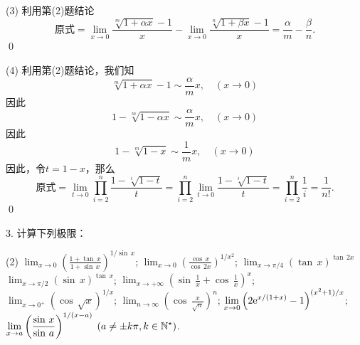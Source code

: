 (3) \solve 利用第(2)题结论
\begin{equation}
    \text{原式} = \lim_{x \to 0} \frac{\sqrt[m]{1+\alpha x}-1}{x} - \lim_{x \to 0} \frac{\sqrt[n]{1+\beta x}-1}{x} = \frac{\alpha}{m} - \frac{\beta}{n}. 
\end{equation}
\qed\bigskip

(4) \solve 利用第(2)题结论，我们知
\begin{equation}
    \sqrt[m]{1+\alpha x} - 1 \sim \frac{\alpha}{m} x, \quad (x \to 0)
\end{equation}
因此
\begin{equation}
    1 - \sqrt[m]{1-\alpha x} \sim \frac{\alpha}{m} x, \quad (x \to 0)
\end{equation}
因此
\begin{equation}
    1 - \sqrt[m]{1-x} \sim \frac{1}{m}x, \quad (x \to 0)
\end{equation}
因此，令$t = 1-x$，那么
\begin{equation}
    \text{原式} = \lim_{t \to 0} \prod_{i=2}^{n} \frac{1-\sqrt[i]{1-t}}{t} = \prod_{i=2}^{n}\lim_{t \to 0} \frac{1-\sqrt[i]{1-t}}{t} = \prod_{i=2}^n \frac{1}{i} = \frac{1}{n!}.
\end{equation}
\qed\bigskip

3. 计算下列极限：
\begin{tasks}(2)
    \task $\displaystyle\lim_{x \to 0}\left(\displaystyle\frac{1+\tan \, x}{1+\sin \, x}\right)^{1/ \sin \, x}$;
    \task $\displaystyle\lim_{x \to 0} \left(\displaystyle\frac{\cos \, x}{\cos \, 2x}\right)^{1/x^2}$;
    \task $\displaystyle\lim_{x \to \pi /4} \left(\tan \, x\right)^{\tan \, 2x}$ 
    \task $\displaystyle\lim_{x \to \pi /2} \left(\sin \, x\right)^{\tan \, x}$;
    \task $\displaystyle\lim_{x \to +\infty} \left(\sin \, \displaystyle\frac{1}{x} + \cos \, \displaystyle\frac{1}{x}\right)^x$;
    \task $\displaystyle\lim_{x \to 0^+} \left(\cos \, \sqrt{x}\right)^{1/x}$;
    \task $\displaystyle\lim_{n \to \infty} \left(\cos \, \displaystyle\frac{x}{\sqrt{n}}\right)^n$;
    \task $\displaystyle\lim_{x \to 0} \left(2 \mathrm{e}^{x/(1+x)}-1\right)^{(x^2+1)/x}$;
    \task $\displaystyle\lim_{x \to a}\left(\displaystyle\frac{\sin \, x}{\sin \, a}\right)^{1/(x-a)} \; (a \neq \pm k \pi, k \in \mathbb{N}^\star)$.
\end{tasks}
\bigskip

